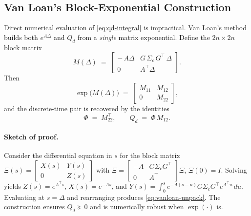 \documentclass[11pt]{article}
\begin{document}
\subsection{Van Loan’s Block-Exponential Construction}
Direct numerical evaluation of \eqref{eq:qd-integral} is impractical. Van Loan’s method builds
both $e^{A\Delta}$ and $Q_d$ from a \emph{single} matrix exponential. Define the $2n\times 2n$ block matrix
\begin{equation}
M(\Delta) \;=\; 
\begin{bmatrix}
-\,A\Delta & G\,\Sigma_c\,G^\top\,\Delta\\[2pt]
0 & A^\top\Delta
\end{bmatrix}.
\label{eq:vanloan-M}
\end{equation}
Then
\begin{equation}
\exp\!\big(M(\Delta)\big) \;=\;
\begin{bmatrix}
M_{11} & M_{12}\\[2pt]
0 & M_{22}
\end{bmatrix},
\label{eq:vanloan-exp}
\end{equation}
and the discrete-time pair is recovered by the identities
\begin{equation}
\Phi \;=\; M_{22}^\top,\qquad
Q_d \;=\; \Phi\,M_{12}.
\label{eq:vanloan-unpack}
\end{equation}

\paragraph{Sketch of proof.}
Consider the differential equation in $s$ for the block matrix
\(
\Xi(s)=
\begin{bmatrix}
X(s) & Y(s)\\ 0 & Z(s)
\end{bmatrix}
\)
with $\dot\Xi = 
\begin{bmatrix}
- A & G\Sigma_c G^\top\\ 0 & A^\top
\end{bmatrix}\Xi$, $\Xi(0)=I$.
Solving yields $Z(s)=e^{A^\top s}$, $X(s)=e^{-As}$,
and $Y(s)=\int_0^s e^{-A(s-u)} G\Sigma_c G^\top e^{A^\top u}\,du$.
Evaluating at $s=\Delta$ and rearranging produces \eqref{eq:vanloan-unpack}.
The construction ensures $Q_d\succeq 0$ and is numerically robust when $\exp(\cdot)$ is.
\end{document}
